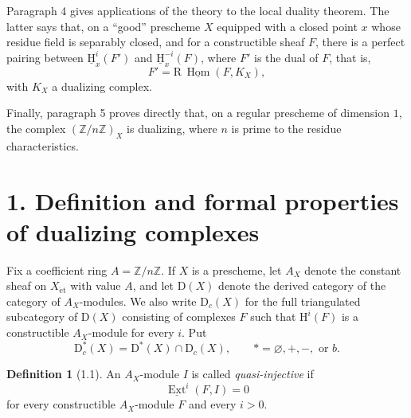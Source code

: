 \documentclass[11pt,a4paper]{article}
\newcommand{\Z}{\mathbb{Z}}
\newcommand{\D}{\mathrm{D}}
\DeclareMathOperator{\Hom}{Hom}
\DeclareMathOperator{\Ext}{Ext}
\newcommand{\uExt}{\underline{\Ext}}
\theoremstyle{plain}
\theoremstyle{definition}
\newtheorem*{definitionstar}{Definition}
\begin{document}
Paragraph 4 gives applications of the theory to the local duality theorem. The latter says that, on a ``good'' prescheme $X$ equipped with a closed point $x$ whose residue field is separably closed, and for a constructible sheaf $F$, there is a perfect pairing between $\underline{\mathrm H}^i_x(F')$ and $\underline{\mathrm H}^{-i}_x(F)$, where $F'$ is the dual of $F$, that is,
\[
F'=\mathrm{R}\,\underline{\Hom}(F,K_X),
\]
with $K_X$ a dualizing complex.

Finally, paragraph 5 proves directly that, on a regular prescheme of dimension $1$, the complex $(\Z/n\Z)_X$ is dualizing, where $n$ is prime to the residue characteristics.

\section*{1. Definition and formal properties of dualizing complexes}

Fix a coefficient ring $A=\Z/n\Z$. If $X$ is a prescheme, let $A_X$ denote the constant sheaf on $X_{\mathrm{\acute{e}t}}$ with value $A$, and let $\D(X)$ denote the derived category of the category of $A_X$-modules. We also write $\D_c(X)$ for the full triangulated subcategory of $\D(X)$ consisting of complexes $F$ such that $\mathrm H^i(F)$ is a constructible $A_X$-module for every $i$. Put
\[
\D_c^*(X)=\D^*(X)\cap \D_c(X),\qquad *=\varnothing,+,-,\text{ or }b.
\]

\begin{definitionstar}[1.1]
An $A_X$-module $I$ is called \emph{quasi-injective} if
\[
\uExt^i(F,I)=0
\]
for every constructible $A_X$-module $F$ and every $i>0$.
\end{definitionstar}
\end{document}
